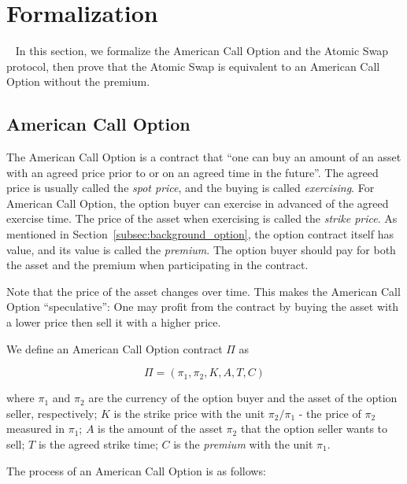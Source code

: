 \section{Formalization}
\label{sec:formalization}

~
In this section, we formalize the American Call Option and the Atomic Swap protocol,
then prove that the Atomic Swap is equivalent to an American Call Option without the premium.

\subsection{American Call Option}

The American Call Option is a contract that ``one can buy an amount of an asset with an agreed price prior to or on an agreed time in the future''. 
The agreed price is usually called the \textit{spot price}, and the buying is called \textit{exercising}.
For American Call Option, the option buyer can exercise in advanced of the agreed exercise time.
The price of the asset when exercising is called the \textit{strike price}.
As mentioned in Section~\ref{subsec:background_option}, the option contract itself has value, and its value is called the \textit{premium}.
The option buyer should pay for both the asset and the premium when participating in the contract.

Note that the price of the asset changes over time. This makes the American Call Option ``speculative'': One may profit from the contract by buying the asset with a lower price then sell it with a higher price.

\begin{definition}
We define an American Call Option contract $\Pi$ as

$$\Pi = (\pi_1, \pi_2, K, A, T, C)$$

where
$\pi_1$ and $\pi_2$ are the currency of the option buyer and the asset of the option seller, respectively; 
$K$ is the strike price with the unit $\pi_2 / \pi_1$ - the price of $\pi_2$ measured in $\pi_1$;
$A$ is the amount of the asset $\pi_2$ that the option seller wants to sell;
$T$ is the agreed strike time;
$C$ is the \textit{premium} with the unit $\pi_1$.
\end{definition}

The process of an American Call Option is as follows:

